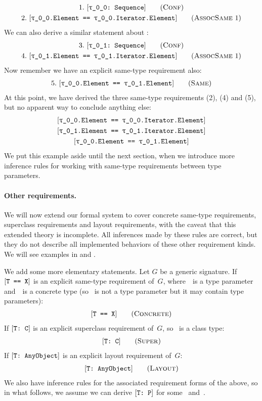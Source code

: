 \documentclass[../generics]{subfiles}
\begin{document}
\begin{example}
\begin{gather*}
\ConfStep{\rT}{Sequence}{1}\\
\AssocSameStep{1}{\rT.Element}{\rT.Iterator.Element}{2}
\end{gather*}
We can also derive a similar statement about \rU:
\begin{gather*}
\ConfStep{\rU}{Sequence}{3}\\
\AssocSameStep{1}{\rU.Element}{\rU.Iterator.Element}{4}
\end{gather*}
Now remember we have an explicit same-type requirement also:
\begin{gather*}
\SameStep{\rT.Element}{\rU.Element}{5}
\end{gather*}
At this point, we have derived the three same-type requirements (2), (4) and (5), but no apparent way to conclude anything else:
\begin{gather*}
\SameReq{\rT.Element}{\rT.Iterator.Element}\\
\SameReq{\rU.Element}{\rU.Iterator.Element}\\
\SameReq{\rT.Element}{\rU.Element}
\end{gather*}
We put this example aside until the next section, when we introduce more inference rules for working with same-type requirements between type parameters.
\end{example}

\paragraph{Other requirements.}
We will now extend our formal system to cover concrete same-type requirements, superclass requirements and layout requirements, with the caveat that this extended theory is incomplete. All inferences made by these rules are correct, but they do not describe all implemented behaviors of these other requirement kinds. We will see examples in  and .

We add some more elementary statements. Let $G$ be a generic signature. If $[\texttt{T == X}]$ is an explicit same-type requirement of~$G$, where~\tT\ is a type parameter and~\tX\ is a concrete type (so \tX\ is not a type parameter but it may contain type parameters):
\begin{gather*}
\ConcreteStepDef
\end{gather*}
If $[\texttt{T:~C}]$ is an explicit superclass requirement of~$G$, so \tC\ is a class type:
\begin{gather*}
\SuperStepDef
\end{gather*}
If $[\texttt{T:~AnyObject}]$ is an explicit layout requirement of~$G$:
\begin{gather*}
\LayoutStepDef
\end{gather*}
We also have inference rules for the associated requirement forms of the above, so in what follows, we assume we can derive $[\texttt{T:~P}]$ for some \tT~and~\tP.
\end{document}
